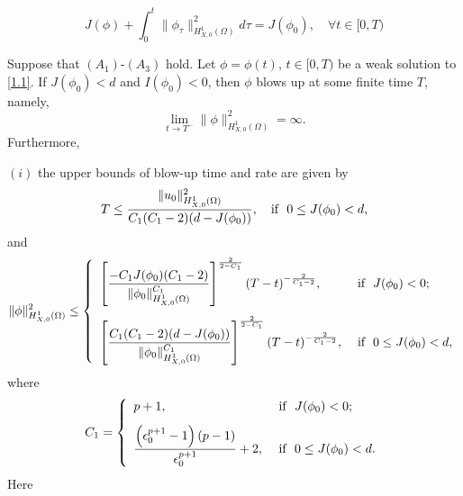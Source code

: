 \documentclass[10pt,a4paper]{amsart}
\newcommand{\ds}{\displaystyle}
\begin{document}
\begin{equation}\label{nengliangdengshi}
J(\phi)+\int_0^t\|\phi_\tau\|_{H_{X,0}^1(\Omega)}^2d\tau=J(\phi_0),\quad \forall t\in[0,T)
\end{equation}

\begin{thm}\label{baopo}
Suppose that $(A_1)$-$(A_3)$ hold. Let $\phi=\phi(t)$, $t\in[0,T)$ be a weak solution to \eqref{1.1}. If $J(\phi_0)<d$ and $I(\phi_0)<0$, then $\phi$ blows up at some finite time $T$, namely,
\begin{equation*}
\lim_{t\rightarrow T^-}\|\phi\|_{H_{X,0}^1(\Omega)}^2=\infty.
\end{equation*}
Furthermore,
\begin{description}
  \item{$(i)$} the upper bounds of blow-up time and rate are given by
  \begin{equation}\label{ut}
  T\leq\frac{\|u_0\|_{H_{X,0}^1(\Omega)}^2}{C_1(C_1-2)(d-J(\phi_0))},\hbox{~~~if~~}0\leq J(\phi_0)<d,
  \end{equation}
  and
  \begin{equation}\label{ur}
  \|\phi\|_{H_{X,0}^1(\Omega)}^2\leq\left\{
               \begin{array}{ll}
               \ds  \left[\frac{-C_1J(\phi_0)(C_1-2)}{\|\phi_0\|_{H_{X,0}^1(\Omega)}^{C_1}}\right]^{\frac{2}{2-C_1}}(T-t)^{-\frac{2}{C_1-2}},&\hbox{~if~~}J(\phi_0)<0; \\
               \vspace{-0.05in}\\
               \ds  \left[\frac{C_1(C_1-2)(d-J(\phi_0))}{\|\phi_0\|_{H_{X,0}^1(\Omega)}^{C_1}}\right]^{\frac{2}{2-C_1}}(T-t)^{-\frac{2}{C_1-2}},&\hbox{~if~~}0\leq J(\phi_0)<d,
               \end{array}
             \right.
  \end{equation}
  where
  \begin{equation}\label{C1}
  C_1=\left\{
               \begin{array}{ll}
               \ds  p+1,&\hbox{ if~~}J(\phi_0)<0; \\
               \vspace{-0.05in}\\
               \ds  \frac{\left(\epsilon_0^{p+1}-1\right)(p-1)}{\epsilon_0^{p+1}}+2,&\hbox{ if~~}0\leq J(\phi_0)<d.
               \end{array}
             \right.
  \end{equation}
  Here
  \begin{equation}\label{68}

\end{equation}
\end{description}
\end{thm}
\end{document}
